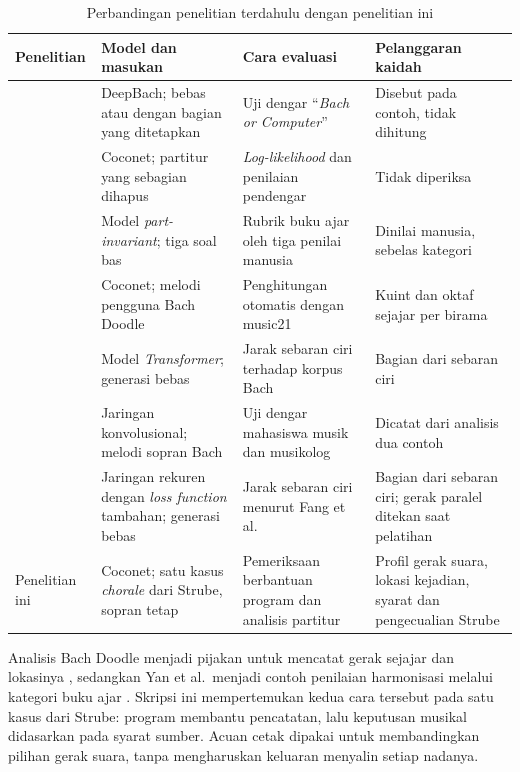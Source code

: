 \begin{table}[ht]
\centering
\footnotesize
\begin{tabularx}{\textwidth}{|>{\raggedright\arraybackslash}p{2.3cm}|>{\raggedright\arraybackslash}X|>{\raggedright\arraybackslash}X|>{\raggedright\arraybackslash}X|}
\hline
\textbf{Penelitian} & \textbf{Model dan masukan} & \textbf{Cara evaluasi} & \textbf{Pelanggaran kaidah} \\ \hline
\textcite{hadjeres2017} & DeepBach; bebas atau dengan bagian yang ditetapkan & Uji dengar ``\textit{Bach or Computer}'' & Disebut pada contoh, tidak dihitung \\ \hline
\textcite{huang2017} & Coconet; partitur yang sebagian dihapus & \textit{Log-likelihood} dan penilaian pendengar & Tidak diperiksa \\ \hline
\textcite{yan2018} & Model \textit{part-invariant}; tiga soal bas & Rubrik buku ajar oleh tiga penilai manusia & Dinilai manusia, sebelas kategori \\ \hline
\textcite{huang2019} & Coconet; melodi pengguna Bach Doodle & Penghitungan otomatis dengan music21 & Kuint dan oktaf sejajar per birama \\ \hline
\textcite{fang2020} & Model \textit{Transformer}; generasi bebas & Jarak sebaran ciri terhadap korpus Bach & Bagian dari sebaran ciri \\ \hline
\textcite{leemhuis2020} & Jaringan konvolusional; melodi sopran Bach & Uji dengar mahasiswa musik dan musikolog & Dicatat dari analisis dua contoh \\ \hline
\textcite{choi2023} & Jaringan rekuren dengan \textit{loss function} tambahan; generasi bebas & Jarak sebaran ciri menurut Fang et al. & Bagian dari sebaran ciri; gerak paralel ditekan saat pelatihan \\ \hline
Penelitian ini & Coconet; satu kasus \textit{chorale} dari Strube, sopran tetap & Pemeriksaan berbantuan program dan analisis partitur & Profil gerak suara, lokasi kejadian, syarat dan pengecualian Strube \\ \hline
\end{tabularx}
\caption{Perbandingan penelitian terdahulu dengan penelitian ini}
\label{tab:posisi-penelitian}
\end{table}

Analisis Bach Doodle menjadi pijakan untuk mencatat gerak sejajar dan lokasinya \parencite[798]{huang2019}, sedangkan Yan et al.\ menjadi contoh penilaian harmonisasi melalui kategori buku ajar \parencite{yan2018}. Skripsi ini mempertemukan kedua cara tersebut pada satu kasus dari Strube: program membantu pencatatan, lalu keputusan musikal didasarkan pada syarat sumber. Acuan cetak dipakai untuk membandingkan pilihan gerak suara, tanpa mengharuskan keluaran menyalin setiap nadanya.

